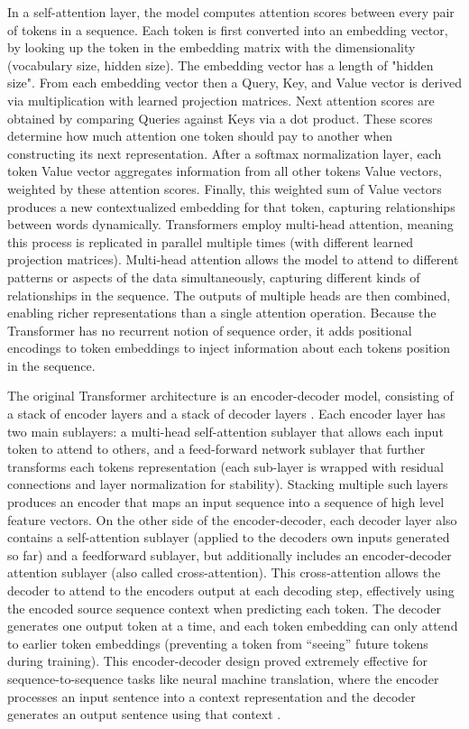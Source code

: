 In a self-attention layer, the model computes attention scores between every pair of tokens in a sequence. 
Each token is first converted into an embedding vector, by looking up the token in the embedding matrix
with the dimensionality (vocabulary size, hidden size). 
The embedding vector has a length of "hidden size".
From each embedding vector then a Query, Key, and Value vector is derived via multiplication with learned 
projection matrices.
Next attention scores are obtained by comparing Queries against Keys via a dot product. 
These scores determine how much attention one token should pay to another when constructing 
its next representation. 
After a softmax normalization layer, each token Value vector aggregates information from all 
other tokens Value vectors, weighted by these attention scores.
Finally, this weighted sum of Value vectors produces a new contextualized embedding for that token, 
capturing relationships between words dynamically.
Transformers employ multi-head attention, meaning this process is replicated in parallel multiple times 
(with different learned projection matrices). 
Multi-head attention allows the model to attend to different patterns or aspects of the data simultaneously, 
capturing different kinds of relationships in the sequence. 
The outputs of multiple heads are then combined, 
enabling richer representations than a single attention operation. 
Because the Transformer has no recurrent notion of sequence order, 
it adds positional encodings to token embeddings to inject information about each tokens position 
in the sequence.

The original Transformer architecture is an encoder-decoder model, 
consisting of a stack of encoder layers and a stack of decoder layers
\cite{attention}
. Each encoder layer has two main sublayers: 
a multi-head self-attention sublayer that allows each input token to attend to others, 
and a feed-forward network sublayer that further transforms each tokens representation 
(each sub-layer is wrapped with residual connections and layer normalization for stability). 
Stacking multiple such layers produces an encoder that maps an input sequence into a sequence of 
high level feature vectors.
On the other side of the encoder-decoder, each decoder layer also contains 
a self-attention sublayer (applied to the decoders own inputs generated so far) and 
a feedforward sublayer, 
but additionally includes an encoder-decoder attention sublayer (also called cross-attention). 
This cross-attention allows the decoder to attend to the encoders output at each decoding step, 
effectively using the encoded source sequence context when predicting each token. 
The decoder generates one output token at a time, 
and each token embedding can only attend to earlier 
token embeddings (preventing a token from “seeing” future tokens during training). 
This encoder-decoder design proved extremely effective for sequence-to-sequence tasks like 
neural machine translation, 
where the encoder processes an input sentence into a context representation and 
the decoder generates an output sentence using that context \cite{deep_translate, gtrans}.


